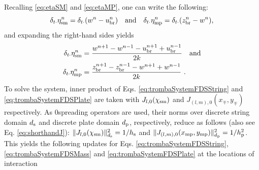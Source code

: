 Recalling \eqref{eq:etaSM} and \eqref{eq:etaMP}, one can write the following:
\begin{equation*}
    \delta_{t\cdot}\eta_{\text{sm}}^n = \delta_{t\cdot}(w^n - u_\text{br}^n) \quad \text{and} \quad\delta_{t\cdot}\eta_{\text{mp}}^n = \delta_{t\cdot}(z_\text{br}^n - w^n),
\end{equation*}
and expanding the right-hand sides yields
\begin{equation}\label{eq:expandedEtas}
\begin{aligned}
    \delta_{t\cdot}\eta_{\text{sm}}^n &= \frac{w^{n+1}-w^{n-1}-u_\text{br}^{n+1}+u_\text{br}^{n-1}}{2k} \quad \text{and}\\ \delta_{t\cdot}\eta_{\text{mp}}^n &= \frac{z_\text{br}^{n+1}-z_\text{br}^{n-1}-w^{n+1}+w^{n-1}}{2k}\ .
    \end{aligned}
\end{equation}
To solve the system, inner product of Eqs. \eqref{eq:trombaSystemFDSString} and \eqref{eq:trombaSystemFDSPlate} are taken with $J_{l,0}(\chi_{\text{sm}})$ and $J_{(l,m),0}(x_\mp, y_\mp)$ respectively. As $0$\thOrder spreading operators are used, their norms over discrete string domain $d_{\text{s}}$ and discrete plate domain $d_{\text{p}}$, respectively, reduce as follows (also see Eq. \eqref{eq:shorthandJ}): $\lVert J_{l,0}(\chi_{\text{sm}}) \rVert_{d_{\text{s}}}^2 = 1/h_{\text{s}}$ and $\lVert J_{(l,m),0}(x_{\text{mp}}, y_{\text{mp}})\rVert_{d_{\text{p}}}^2 = 1/h_{\text{p}}^2$. This yields the following updates for Eqs. \eqref{eq:trombaSystemFDSString}, \eqref{eq:trombaSystemFDSMass} and \eqref{eq:trombaSystemFDSPlate} at the locations of interaction
